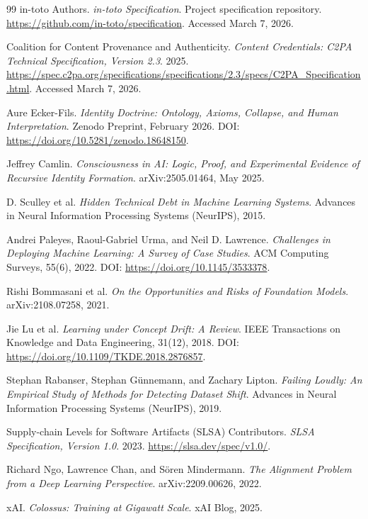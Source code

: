 \documentclass[11pt,a4paper]{article}
\begin{document}
\begin{thebibliography}{99}
in-toto Authors. \textit{in-toto Specification}. Project specification repository. \url{https://github.com/in-toto/specification}. Accessed March 7, 2026.

Coalition for Content Provenance and Authenticity. \textit{Content Credentials: C2PA Technical Specification, Version 2.3}. 2025. \url{https://spec.c2pa.org/specifications/specifications/2.3/specs/C2PA_Specification.html}. Accessed March 7, 2026.

Aure Ecker-Fils. \textit{Identity Doctrine: Ontology, Axioms, Collapse, and Human Interpretation}. Zenodo Preprint, February 2026. DOI: \url{https://doi.org/10.5281/zenodo.18648150}.

Jeffrey Camlin. \textit{Consciousness in AI: Logic, Proof, and Experimental Evidence of Recursive Identity Formation}. arXiv:2505.01464, May 2025.

D. Sculley et al. \textit{Hidden Technical Debt in Machine Learning Systems}. Advances in Neural Information Processing Systems (NeurIPS), 2015.

Andrei Paleyes, Raoul-Gabriel Urma, and Neil D. Lawrence. \textit{Challenges in Deploying Machine Learning: A Survey of Case Studies}. ACM Computing Surveys, 55(6), 2022. DOI: \url{https://doi.org/10.1145/3533378}.

Rishi Bommasani et al. \textit{On the Opportunities and Risks of Foundation Models}. arXiv:2108.07258, 2021.

Jie Lu et al. \textit{Learning under Concept Drift: A Review}. IEEE Transactions on Knowledge and Data Engineering, 31(12), 2018. DOI: \url{https://doi.org/10.1109/TKDE.2018.2876857}.

Stephan Rabanser, Stephan G\"{u}nnemann, and Zachary Lipton. \textit{Failing Loudly: An Empirical Study of Methods for Detecting Dataset Shift}. Advances in Neural Information Processing Systems (NeurIPS), 2019.

Supply-chain Levels for Software Artifacts (SLSA) Contributors. \textit{SLSA Specification, Version 1.0}. 2023. \url{https://slsa.dev/spec/v1.0/}.

Richard Ngo, Lawrence Chan, and S\"{o}ren Mindermann. \textit{The Alignment Problem from a Deep Learning Perspective}. arXiv:2209.00626, 2022.

xAI. \textit{Colossus: Training at Gigawatt Scale}. xAI Blog, 2025.

\end{thebibliography}
\end{document}
